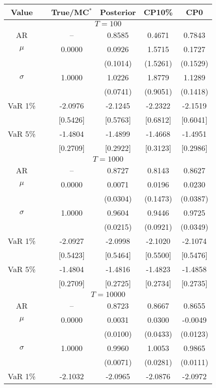{ \renewcommand{\arraystretch}{1.2} 
\begin{table} 
\center 
\begin{tabular}{cc cccc} 
Value & & True/MC$^*$ & Posterior & CP10\% & CP0 \\ \hline 
\hline 
\multicolumn{6}{c}{$T =100$}  \\ 
\hline 
AR && -- & 0.8585 & 0.4671 & 0.7843  \\  
$\mu$&& 0.0000 & 0.0926 & 1.5715 & 0.1727  \\ 
&&   & (0.1014) & (1.5261) & (0.1529)  \\ 
$\sigma$&& 1.0000 & 1.0226 & 1.8779 & 1.1289  \\ 
&&   & (0.0741) & (0.9051) & (0.1418)  \\ 
VaR 1\% && -2.0976 & -2.1245 & -2.2322 & -2.1519  \\ 
  && [0.5426] & [0.5763] & [0.6812] & [0.6041]  \\ 
VaR 5\% && -1.4804 & -1.4899 & -1.4668 & -1.4951  \\ 
 && [0.2709] & [0.2922] & [0.3123] & [0.2986]  \\ 
\hline 
\multicolumn{6}{c}{$T =1000$}  \\ 
\hline 
AR && -- & 0.8727 & 0.8143 & 0.8627  \\  
$\mu$&& 0.0000 & 0.0071 & 0.0196 & 0.0230  \\ 
&&   & (0.0304) & (0.1473) & (0.0387)  \\ 
$\sigma$&& 1.0000 & 0.9604 & 0.9446 & 0.9725  \\ 
&&   & (0.0215) & (0.0921) & (0.0349)  \\ 
VaR 1\% && -2.0927 & -2.0998 & -2.1020 & -2.1074  \\ 
  && [0.5423] & [0.5464] & [0.5500] & [0.5476]  \\ 
VaR 5\% && -1.4804 & -1.4816 & -1.4823 & -1.4858  \\ 
 && [0.2709] & [0.2725] & [0.2734] & [0.2735]  \\ 
\hline 
\multicolumn{6}{c}{$T =10000$}  \\ 
\hline 
AR && -- & 0.8723 & 0.8667 & 0.8655  \\  
$\mu$&& 0.0000 & 0.0031 & 0.0300 & -0.0049  \\ 
&&   & (0.0100) & (0.0433) & (0.0123)  \\ 
$\sigma$&& 1.0000 & 0.9960 & 1.0053 & 0.9865  \\ 
&&   & (0.0071) & (0.0281) & (0.0111)  \\ 
VaR 1\% && -2.1032 & -2.0965 & -2.0876 & -2.0972  \\ 

\end{tabular}
\end{table}}
